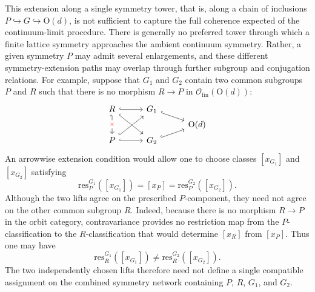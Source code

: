 \documentclass[aps,prx,reprint,superscriptaddress,twocolumn,amsmath,amssymb,amsfonts, nofootinbib]{revtex4-2}
\newcommand{\ofin}{\mathcal{O}_{\text{fin}}}
\newcommand{\res}{\text{res}}
\theoremstyle{apsstyle}
\begin{document}
\medskip 

This extension along a single symmetry tower, that is, along a chain of inclusions $P\hookrightarrow G\hookrightarrow \mathrm{O}(d)$, is not sufficient to capture the full coherence expected of the continuum-limit procedure. There is generally no preferred tower through which a finite lattice symmetry approaches the ambient continuum symmetry. Rather, a given symmetry $P$ may admit several enlargements, and these different symmetry-extension paths may overlap through further subgroup and conjugation relations. 
For example, suppose that $G_1$ and $G_2$ contain two common subgroups $P$ and $R$ such that there is no morphism $R\to P$ in $\ofin(\mathrm{O}(d))$:
\begin{equation*}
\begin{tikzcd}[row sep=0.2em, column sep=2.8em]
    R \arrow[r, hook] \arrow[ddr, hook]  \arrow[dd, hook', "\textcolor{red}{\times}" description] & G_{1} \arrow[dr, hook]\\
    &&\mathrm{O}(d)\\
    P \arrow[r, hook] \arrow[uur, hook] &G_{2} \arrow[ur, hook] 
\end{tikzcd}
\end{equation*}
An arrowwise extension condition would allow one to choose classes $[x_{G_1}]$ and $[x_{G_2}]$ satisfying
\begin{equation*}
\res^{G_1}_P([x_{G_1}]) = [x_P] = \res^{G_2}_P([x_{G_2}]).
\end{equation*}
Although the two lifts agree on the prescribed $P$-component, they need not agree on the other common subgroup $R$. Indeed, because there is no morphism $R\to P$ in the orbit category, contravariance provides no restriction map from the $P$-classification to the $R$-classification that would determine $[x_R]$ from $[x_P]$.
Thus one may have
\begin{equation*}
\res^{G_1}_R([x_{G_1}]) \neq \res^{G_2}_R([x_{G_2}]).
\end{equation*}
The two independently chosen lifts therefore need not define a single compatible assignment on the combined symmetry network containing $P$, $R$, $G_1$, and $G_2$.

\medskip 
\end{document}
